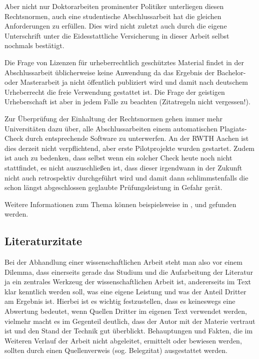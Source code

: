 Aber nicht nur Doktorarbeiten prominenter Politiker unterliegen diesen Rechtsnormen, auch eine studentische Abschlussarbeit hat die gleichen Anforderungen zu erfüllen. Dies wird nicht zuletzt auch durch die eigene Unterschrift unter die Eidesstattliche Versicherung in dieser Arbeit selbst nochmals bestätigt.


Die Frage von Lizenzen für urheberrechtlich geschütztes Material findet in der Abschlussarbeit üblicherweise keine Anwendung da das Ergebnis der Bachelor- oder Masterarbeit ja nicht öffentlich publiziert wird und damit nach deutschem Urheberrecht die freie Verwendung gestattet ist. Die Frage der geistigen Urheberschaft ist aber in jedem Falle zu beachten (Zitatregeln nicht vergessen!).

Zur Überprüfung der Einhaltung der Rechtsnormen gehen immer mehr Universitäten dazu über, alle Abschlussarbeiten einem automatischen Plagiats-Check durch entsprechende Software zu unterwerfen. An der RWTH Aachen ist dies derzeit nicht verpflichtend, aber erste Pilotprojekte wurden gestartet. Zudem ist auch zu bedenken, dass selbst wenn ein solcher Check heute noch nicht stattfindet, es nicht auszuschließen ist, dass dieser irgendwann in der Zukunft nicht auch retrospektiv durchgeführt wird und damit dann schlimmstenfalls die schon längst abgeschlossen geglaubte Prüfungsleistung in Gefahr gerät.

Weitere Informationen zum Thema können beispielsweise in \cite{deutsche_forschungsgemeinschaft_2022_6472827}, \cite{Uni_Wien} und \cite{Unijournal06_4} gefunden werden. 


\subsection{Literaturzitate}
Bei der Abhandlung einer wissenschaftlichen Arbeit steht man also vor einem Dilemma, dass einerseits gerade das Studium und die Aufarbeitung der Literatur ja ein zentrales Werkzeug der wissenschaftlichen Arbeit ist, andererseits im Text klar kenntlich werden soll, was eine eigene Leistung und was der Anteil Dritter am Ergebnis ist. Hierbei ist es wichtig festzustellen, dass es keineswegs eine Abwertung bedeutet, wenn Quellen Dritter im eigenen Text verwendet werden, vielmehr macht es im Gegenteil deutlich, dass der Autor mit der Materie vertraut ist und den Stand der Technik gut überblickt. Behauptungen und Fakten, die im Weiteren Verlauf der Arbeit nicht abgeleitet, ermittelt oder bewiesen werden, sollten durch einen Quellenverweis (sog. Belegzitat) ausgestattet werden.

